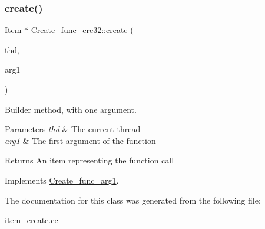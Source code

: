 \subsubsection{\texorpdfstring{create()}{create()}}
{\footnotesize\ttfamily \mbox{\hyperlink{classItem}{Item}} $\ast$ Create\+\_\+func\+\_\+crc32\+::create (\begin{DoxyParamCaption}\item[{T\+HD $\ast$}]{thd,  }\item[{\mbox{\hyperlink{classItem}{Item}} $\ast$}]{arg1 }\end{DoxyParamCaption})\hspace{0.3cm}{\ttfamily [virtual]}}

Builder method, with one argument. 
\begin{DoxyParams}{Parameters}
{\em thd} & The current thread \\
\hline
{\em arg1} & The first argument of the function \\
\hline
\end{DoxyParams}
\begin{DoxyReturn}{Returns}
An item representing the function call 
\end{DoxyReturn}


Implements \mbox{\hyperlink{classCreate__func__arg1_a3e9a98f755cd82c3e762e334c955a8c9}{Create\+\_\+func\+\_\+arg1}}.



The documentation for this class was generated from the following file\+:\begin{DoxyCompactItemize}
\item 
\mbox{\hyperlink{item__create_8cc}{item\+\_\+create.\+cc}}\end{DoxyCompactItemize}
